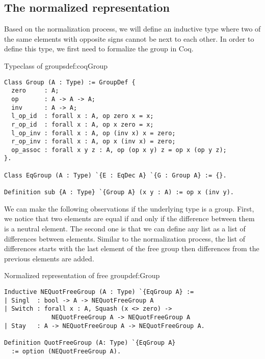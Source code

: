 \subsection{The normalized representation}
Based on the normalization process, we will define an inductive type where two of the same elements with opposite signs cannot be next to each other. In order to define this type, we first need to formalize the group in Coq.
\begin{defi}{Typeclass of groups}{def:coqGroup}
\begin{verbatim}
Class Group (A : Type) := GroupDef {
  zero     : A;
  op       : A -> A -> A;
  inv      : A -> A;
  l_op_id  : forall x : A, op zero x = x;
  r_op_id  : forall x : A, op x zero = x;
  l_op_inv : forall x : A, op (inv x) x = zero;
  r_op_inv : forall x : A, op x (inv x) = zero;
  op_assoc : forall x y z : A, op (op x y) z = op x (op y z);
}.

Class EqGroup (A : Type) `{E : EqDec A} `{G : Group A} := {}.

Definition sub {A : Type} `{Group A} (x y : A) := op x (inv y).
\end{verbatim}
\end{defi}
We can make the following observations if the underlying type is a group. First, we notice that two elements are equal if and only if the difference between them is a neutral element. The second one is that we can define any list as a list of differences between elements. Similar to the normalization process, the list of differences starts with the last element of the free group then differences from the previous elements are added.
\begin{defi}{Normalized representation of free group}{def:Group}
\begin{verbatim}
Inductive NEQuotFreeGroup (A : Type) `{EqGroup A} :=
| Singl  : bool -> A -> NEQuotFreeGroup A
| Switch : forall x : A, Squash (x <> zero) -> 
             NEQuotFreeGroup A -> NEQuotFreeGroup A
| Stay   : A -> NEQuotFreeGroup A -> NEQuotFreeGroup A.

Definition QuotFreeGroup (A: Type) `{EqGroup A} 
  := option (NEQuotFreeGroup A).
\end{verbatim}
\end{defi}
